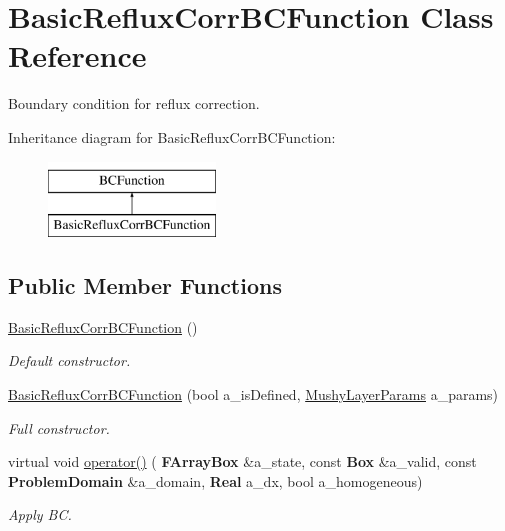 \hypertarget{class_basic_reflux_corr_b_c_function}{}\section{Basic\+Reflux\+Corr\+B\+C\+Function Class Reference}
\label{class_basic_reflux_corr_b_c_function}


Boundary condition for reflux correction.  


Inheritance diagram for Basic\+Reflux\+Corr\+B\+C\+Function\+:\begin{figure}[H]
\begin{center}
\leavevmode
\includegraphics[height=2.000000cm]{class_basic_reflux_corr_b_c_function}
\end{center}
\end{figure}
\subsection*{Public Member Functions}
\begin{DoxyCompactItemize}
\item 
\mbox{\label{class_basic_reflux_corr_b_c_function_a891b9aa97bcbdac51b3f0170c0608255}} 
\hyperlink{class_basic_reflux_corr_b_c_function_a891b9aa97bcbdac51b3f0170c0608255}{Basic\+Reflux\+Corr\+B\+C\+Function} ()
\begin{DoxyCompactList}\small\item\em Default constructor. \end{DoxyCompactList}\item 
\mbox{\label{class_basic_reflux_corr_b_c_function_a785a5780cdf367b9e945f8c991115b9d}} 
\hyperlink{class_basic_reflux_corr_b_c_function_a785a5780cdf367b9e945f8c991115b9d}{Basic\+Reflux\+Corr\+B\+C\+Function} (bool a\+\_\+is\+Defined, \hyperlink{class_mushy_layer_params}{Mushy\+Layer\+Params} a\+\_\+params)
\begin{DoxyCompactList}\small\item\em Full constructor. \end{DoxyCompactList}\item 
\mbox{\label{class_basic_reflux_corr_b_c_function_a2c253616dd672bae591b3686d65270f3}} 
virtual void \hyperlink{class_basic_reflux_corr_b_c_function_a2c253616dd672bae591b3686d65270f3}{operator()} (\textbf{ F\+Array\+Box} \&a\+\_\+state, const \textbf{ Box} \&a\+\_\+valid, const \textbf{ Problem\+Domain} \&a\+\_\+domain, \textbf{ Real} a\+\_\+dx, bool a\+\_\+homogeneous)
\begin{DoxyCompactList}\small\item\em Apply BC. \end{DoxyCompactList}\end{DoxyCompactItemize}
